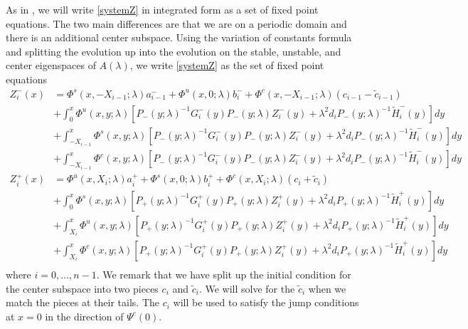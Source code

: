 \documentclass[thesis.tex]{subfiles}
\begin{document}
As in \cite{Sandstede1998}, we will write \eqref{systemZ} in integrated form as a set of fixed point equations. The two main differences are that we are  on a periodic domain and there is an additional center subspace. Using the variation of constants formula and splitting the evolution up into the evolution on the stable, unstable, and center eigenspaces of $A(\lambda)$, we write \eqref{systemZ} as the set of fixed point equations
\begin{equation}\label{Zfpeq}
\begin{aligned}
Z_i^-(x) &= \Phi^s(x, -X_{i-1}; \lambda) a_{i-1}^- + \Phi^u(x, 0; \lambda) b_i^- + \Phi^c(x, -X_{i-1}; \lambda) (c_{i-1} - \tilde{c}_{i-1})\ \\
&+ \int_0^x \Phi^u(x, y; \lambda)[P_-(y; \lambda)^{-1} G_i^-(y) P_-(y; \lambda)Z_i^-(y) + \lambda^2 d_i P_-(y; \lambda)^{-1} \tilde{H}_i^-(y)] dy \\
&+ \int_{-X_{i-1}}^x \Phi^s(x, y; \lambda)[P_-(y; \lambda)^{-1} G_i^-(y) P_-(y; \lambda)Z_i^-(y) + \lambda^2 d_i P_-(y; \lambda)^{-1} \tilde{H}_i^-(y)] dy \\
&+ \int_{-X_{i-1}}^x \Phi^c(x, y; \lambda) [P_-(y; \lambda)^{-1} G_i^-(y) P_-(y; \lambda)Z_i^-(y) + \lambda^2 d_i P_-(y; \lambda)^{-1} \tilde{H}_i^-(y)] dy  \\ 
Z_i^+(x) &= \Phi^u(x, X_i; \lambda) a_i^+ + \Phi^s(x, 0; \lambda) b_i^+ + \Phi^c(x, X_i; \lambda)(c_i + \tilde{c}_i) \\
&+ \int_0^x \Phi^s(x, y; \lambda) [P_+(y; \lambda)^{-1} G_i^+(y) P_+(y; \lambda) Z_i^+(y) + \lambda^2 d_i P_+(y; \lambda)^{-1} \tilde{H}_i^+(y)] dy \\
&+ \int_{X_i}^x \Phi^u(x, y; \lambda) [P_+(y; \lambda)^{-1} G_i^+(y) P_+(y; \lambda) Z_i^+(y) + \lambda^2 d_i P_+(y; \lambda)^{-1} \tilde{H}_i^+(y)] dy \\
&+ \int_{X_i}^x \Phi^c(x, y; \lambda) [P_+(y; \lambda)^{-1} G_i^+(y) P_+(y; \lambda) Z_i^+(y) + \lambda^2 d_i P_+(y; \lambda)^{-1} \tilde{H}_i^+(y)] dy \\
\end{aligned}
\end{equation}
where $i = 0, \dots, n-1$. We remark that we have split up the initial condition for the center subspace into two pieces $c_i$ and $\tilde{c}_i$. We will solve for the $\tilde{c}_i$ when we match the pieces at their tails. The $c_i$ will be used to satisfy the jump conditions at $x = 0$ in the direction of $\Psi^c(0)$. 
\end{document}
